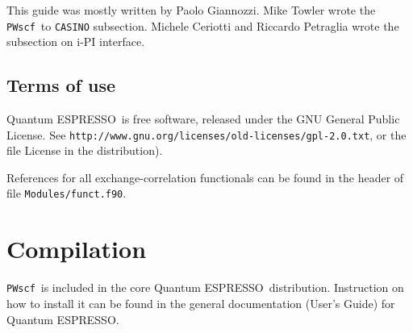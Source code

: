 \documentclass[12pt,a4paper]{article}
\def\PWscf{\texttt{PWscf}}
\def\qe{{\sc Quantum ESPRESSO}}
\begin{document}

This guide was mostly written by Paolo Giannozzi.
Mike Towler wrote the \PWscf\ to \texttt{CASINO} subsection.
Michele Ceriotti and Riccardo Petraglia wrote the subsection on i-PI
interface.

 \subsection{Terms of use}

\qe\ is free software, released under the 
GNU General Public License. See
\texttt{http://www.gnu.org/licenses/old-licenses/gpl-2.0.txt}, 
or the file License in the distribution).
    


References for all exchange-correlation functionals can be found in the header
of file \texttt{Modules/funct.f90}.

\section{Compilation}

\PWscf\ is included in the core \qe\ distribution.
Instruction on how to install it can be found in the
general documentation (User's Guide) for \qe.
\end{document}
